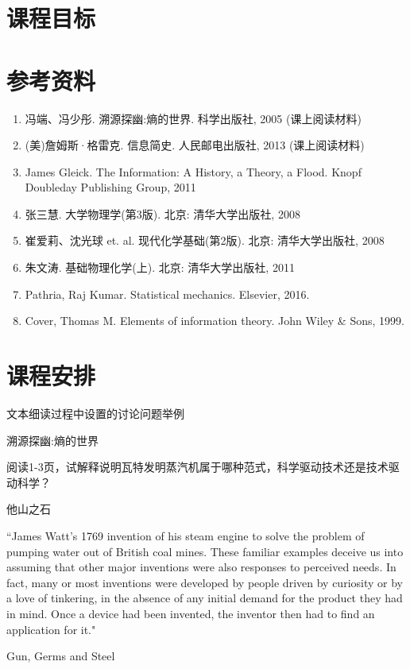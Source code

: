 \documentclass[12pt]{ctexart}
\begin{document}
\section{课程目标}



\section{参考资料}
\begin{enumerate}
\item 冯端、冯少彤. 溯源探幽:熵的世界. 科学出版社, 2005 (课上阅读材料)
\item (美)詹姆斯·格雷克. 信息简史. 人民邮电出版社, 2013 (课上阅读材料)
\item James Gleick. The Information: A History, a Theory, a Flood. Knopf Doubleday Publishing Group, 2011
\item 张三慧. 大学物理学(第3版).  北京: 清华大学出版社, 2008
\item 崔爱莉、沈光球 et. al. 现代化学基础(第2版). 北京: 清华大学出版社, 2008
\item 朱文涛. 基础物理化学(上). 北京: 清华大学出版社, 2011
\item Pathria, Raj Kumar. Statistical mechanics. Elsevier, 2016.
\item Cover, Thomas M. Elements of information theory. John Wiley \& Sons, 1999.
\end{enumerate}

\section{课程安排}



文本细读过程中设置的讨论问题举例


溯源探幽:熵的世界

阅读1-3页，试解释说明瓦特发明蒸汽机属于哪种范式，科学驱动技术还是技术驱动科学？

他山之石

``James Watt’s 1769 invention of his steam engine to solve the problem of pumping water out of British coal mines.
These familiar examples deceive us into assuming that other major inventions were also responses to perceived needs. In fact, many or most inventions were developed by people driven by curiosity or by a love of tinkering, in the absence of any initial demand for the product they had in mind. Once a device had been invented, the inventor then had to find an application for it."


Gun, Germs and Steel
\end{document}
